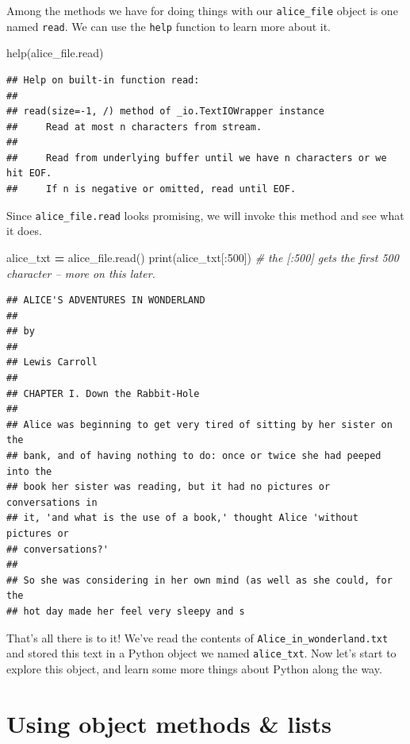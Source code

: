 \documentclass[]{book}
\newenvironment{Shaded}{\begin{snugshade}}{\end{snugshade}}
\newcommand{\BuiltInTok}[1]{#1}
\newcommand{\CommentTok}[1]{\textcolor[rgb]{0.56,0.35,0.01}{\textit{#1}}}
\newcommand{\DecValTok}[1]{\textcolor[rgb]{0.00,0.00,0.81}{#1}}
\newcommand{\NormalTok}[1]{#1}
\newcommand{\OperatorTok}[1]{\textcolor[rgb]{0.81,0.36,0.00}{\textbf{#1}}}
\begin{document}
Among the methods we have for doing things with our \texttt{alice\_file} object is one named \texttt{read}. We can use the \texttt{help} function to learn more about it.

\begin{Shaded}
\begin{Highlighting}[]
\BuiltInTok{help}\NormalTok{(alice_file.read)}
\end{Highlighting}
\end{Shaded}

\begin{verbatim}
## Help on built-in function read:
## 
## read(size=-1, /) method of _io.TextIOWrapper instance
##     Read at most n characters from stream.
##     
##     Read from underlying buffer until we have n characters or we hit EOF.
##     If n is negative or omitted, read until EOF.
\end{verbatim}

Since \texttt{alice\_file.read} looks promising, we will invoke this method and see what it does.

\begin{Shaded}
\begin{Highlighting}[]
\NormalTok{alice_txt }\OperatorTok{=}\NormalTok{ alice_file.read()}
\BuiltInTok{print}\NormalTok{(alice_txt[:}\DecValTok{500}\NormalTok{]) }\CommentTok{# the [:500] gets the first 500 character -- more on this later.}
\end{Highlighting}
\end{Shaded}

\begin{verbatim}
## ﻿ALICE'S ADVENTURES IN WONDERLAND
## 
## by
## 
## Lewis Carroll
## 
## CHAPTER I. Down the Rabbit-Hole
## 
## Alice was beginning to get very tired of sitting by her sister on the
## bank, and of having nothing to do: once or twice she had peeped into the
## book her sister was reading, but it had no pictures or conversations in
## it, 'and what is the use of a book,' thought Alice 'without pictures or
## conversations?'
## 
## So she was considering in her own mind (as well as she could, for the
## hot day made her feel very sleepy and s
\end{verbatim}

That's all there is to it! We've read the contents of \texttt{Alice\_in\_wonderland.txt} and stored this text in a Python object we named \texttt{alice\_txt}. Now let's start to explore this object, and learn some more things about Python along the way.

\hypertarget{using-object-methods-lists}{%
\section{Using object methods \& lists}\label{using-object-methods-lists}}
\end{document}
